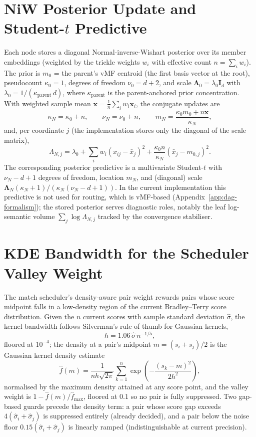 \section{NiW Posterior Update and Student-$t$ Predictive}\label{sec:num-niw}

Each node stores a diagonal Normal-inverse-Wishart posterior over its
member embeddings (weighted by the trickle weights $w_i$ with
effective count $n = \sum_i w_i$).
The prior is
$m_0$ = the parent's vMF centroid (the first
basis vector at the root), pseudocount $\kappa_0 = 1$, degrees of
freedom $\nu_0 = d + 2$, and scale
$\boldsymbol{\Lambda}_0 = \lambda_0 \mathbf{I}_d$ with $\lambda_0 =
1/(\kappa_{\text{parent}}\, d)$, where $\kappa_{\text{parent}}$ is
the parent-anchored prior concentration.
With weighted sample mean
$\bar{\mathbf{x}} = \tfrac{1}{n}\sum_i w_i \mathbf{x}_i$, the
conjugate updates are
\[
\kappa_N = \kappa_0 + n,
\qquad
\nu_N = \nu_0 + n,
\qquad
m_N = \frac{\kappa_0 m_0 + n \bar{\mathbf{x}}}{\kappa_N},
\]
and, per coordinate $j$ (the implementation stores only the diagonal
of the scale matrix),
\[
\Lambda_{N,j}
= \lambda_0
+ \sum_i w_i \left(x_{ij} - \bar{x}_j\right)^2
+ \frac{\kappa_0 n}{\kappa_N}\left(\bar{x}_j - m_{0,j}\right)^2 .
\]
The corresponding posterior predictive is a multivariate Student-$t$
with $\nu_N - d + 1$ degrees of freedom, location $m_N$, and (diagonal)
scale $\boldsymbol{\Lambda}_N (\kappa_N + 1) / (\kappa_N (\nu_N - d +
1))$.
In the current implementation this predictive is not used for routing,
which is vMF-based (Appendix~\ref{app:dag-formalism}); the stored
posterior serves
diagnostic roles, notably the leaf log-semantic volume
$\sum_j \log \Lambda_{N,j}$ tracked by the convergence stabiliser.

\section{KDE Bandwidth for the Scheduler Valley Weight}\label{sec:num-kde}

The match scheduler's density-aware pair weight rewards pairs whose
score midpoint falls in a low-density region of the current
Bradley--Terry score distribution.
Given the $n$ current scores with sample standard deviation
$\hat{\sigma}$, the kernel bandwidth follows Silverman's rule of
thumb for Gaussian kernels,
\[
h = 1.06\, \hat{\sigma}\, n^{-1/5},
\]
floored at $10^{-4}$; the density at a pair's midpoint
$m = (s_i + s_j)/2$ is the Gaussian kernel density estimate
\[
\hat{f}(m) = \frac{1}{n h \sqrt{2\pi}}
\sum_{k=1}^{n} \exp\!\left(-\frac{(s_k - m)^2}{2h^2}\right),
\]
normalised by the maximum density attained at any score point, and
the valley weight is $1 - \hat{f}(m)/\hat{f}_{\max}$, floored at
$0.1$ so no pair is fully suppressed.
Two gap-based guards precede the density term: a pair whose score gap
exceeds $4(\hat{\sigma}_i + \hat{\sigma}_j)$ is suppressed entirely
(already decided), and a pair below the noise floor
$0.15(\hat{\sigma}_i + \hat{\sigma}_j)$ is linearly ramped
(indistinguishable at current precision).

